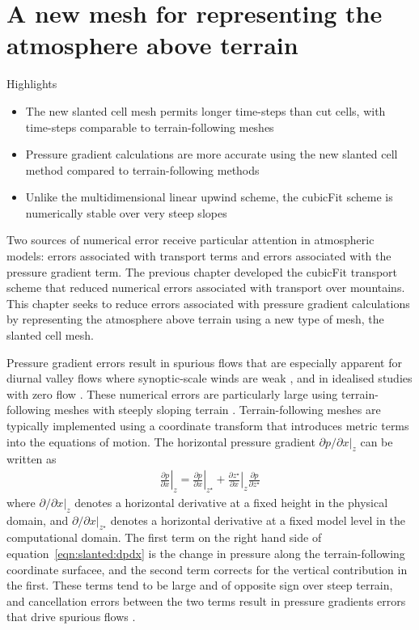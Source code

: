 \chapter{A new mesh for representing the atmosphere above terrain}
\label{ch:slanted}

\begin{highlights}
{\Large Highlights}
\begin{itemize}
	\item The new slanted cell mesh permits longer time-steps than cut cells, with time-steps comparable to terrain-following meshes
	\item Pressure gradient calculations are more accurate using the new slanted cell method compared to terrain-following methods
	\item Unlike the multidimensional linear upwind scheme, the cubicFit scheme is numerically stable over very steep slopes
\end{itemize}
\end{highlights}

Two sources of numerical error receive particular attention in atmospheric models: errors associated with transport terms and errors associated with the pressure gradient term.
The previous chapter developed the cubicFit transport scheme that reduced numerical errors associated with transport over mountains.
This chapter seeks to reduce errors associated with pressure gradient calculations by representing the atmosphere above terrain using a new type of mesh, the slanted cell mesh.

Pressure gradient errors result in spurious flows that are especially apparent for diurnal valley flows where synoptic-scale winds are weak \citep{fast2003}, and in idealised studies with zero flow \citep{zaengl2004a,klemp2011}.  
These numerical errors are particularly large using terrain-following meshes with steeply sloping terrain \citep{zaengl2012}.
Terrain-following meshes are typically implemented using a coordinate transform that introduces metric terms into the equations of motion.  The horizontal pressure gradient $\left. \partial p / \partial x \right|_z$ can be written as \citep{mahrer1984}
\begin{align}
	\left. \frac{\partial p}{\partial x} \right|_z = 
	\left. \frac{\partial p}{\partial x} \right|_{z^\star} +
	\left. \frac{\partial z^\star}{\partial x} \right|_z
	\frac{\partial p}{\partial z^\star} \label{eqn:slanted:dpdx}
\end{align}
where $\left. \partial / \partial x \right|_z$ denotes a horizontal derivative at a fixed height in the physical domain, and $\left. \partial / \partial x \right|_{z^\star}$ denotes a horizontal derivative at a fixed model level in the computational domain.  The first term on the right hand side of equation~\eqref{eqn:slanted:dpdx} is the change in pressure along the terrain-following coordinate surfacee, and the second term corrects for the vertical contribution in the first.
These terms tend to be large and of opposite sign over steep terrain, and cancellation errors between the two terms result in pressure gradients errors that drive spurious flows \citep{fast2003}.

